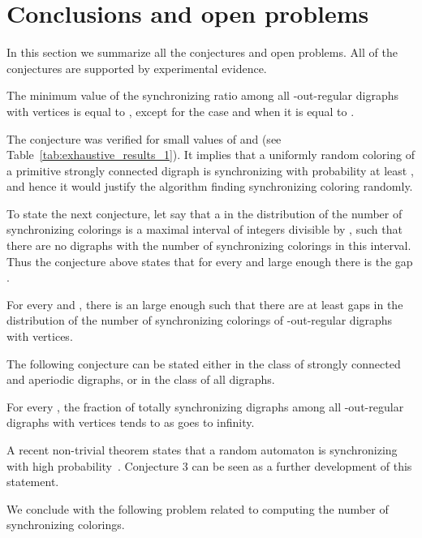 \documentclass[runningheads]{llncs}
\begin{document}
\section{Conclusions and open problems}

In this section we summarize all the conjectures and open problems.
All of the conjectures are supported by experimental evidence.

\begin{conjecture}
The minimum value of the synchronizing ratio among all -out-regular digraphs with  vertices is equal to , except for the case  and  when it is equal to .
\end{conjecture}

The conjecture was verified for small values of  and  (see Table~\ref{tab:exhaustive_results_1}).
It implies that a uniformly random coloring of a primitive strongly connected digraph is synchronizing with probability at least , and hence it would justify the algorithm finding synchronizing coloring randomly.

To state the next conjecture, let say that a  in the distribution of the number of synchronizing colorings is a maximal interval of integers divisible by , such that there are no digraphs with the number of synchronizing colorings in this interval.
Thus the conjecture above states that for every  and  large enough there is the gap .

\begin{conjecture}
For every  and , there is an  large enough such that there are at least  gaps in the distribution of the number of synchronizing colorings of -out-regular digraphs with  vertices.
\end{conjecture}

The following conjecture can be stated either in the class of strongly connected and aperiodic digraphs, or in the class of all digraphs.

\begin{conjecture}
For every , the fraction of totally synchronizing digraphs among all -out-regular digraphs with  vertices tends to  as  goes to infinity.
\end{conjecture}
A recent non-trivial theorem states that a random automaton is synchronizing with high probability~\cite{Berlinkov2013OnTheProbabilityToBeSynchronizable,Nicaud2014FastSynchronizationOfRandomAutomata}. Conjecture 3 can be seen as a further development of this statement.

We conclude with the following problem related to computing the number of synchronizing colorings.
\end{document}
